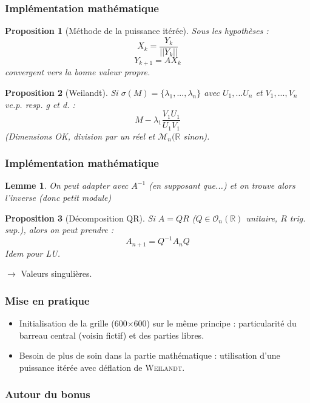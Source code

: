 \documentclass[11pt]{beamer}
\newtheorem{proposition}{Proposition}[section]
\newtheorem{lemme}{Lemme}[section]
\begin{document}
	\begin{frame}
		\frametitle{Implémentation mathématique}
		\begin{proposition}[Méthode de la puissance itérée]
			Sous les hypothèses :
			\[X_k=\frac{Y_k}{||Y_k||}\]
			\[Y_{k+1}=AX_k\]
			convergent vers la bonne valeur propre.
		\end{proposition}
	
		\begin{proposition}[Weilandt]
			Si $\sigma(M)=\{\lambda_1,...,\lambda_n\}$ avec $U_1,...U_n$ et $V_1,...,V_n$ ve.p. resp. g et d. :
			\[M-\lambda_1\frac{V_1U_1}{U_1V_1}\]
			(Dimensions OK, division par un réel et $\mathcal{M}_n(\mathbb{R}$ sinon).
		\end{proposition}
	\end{frame}

	\begin{frame}
		\frametitle{Implémentation mathématique}
		\begin{lemme}
			On peut adapter avec $A^{-1}$ (en supposant que...) et on trouve alors l'inverse (donc petit module)
		\end{lemme}
	
		\begin{proposition}[Décomposition QR]
			Si $A=QR$ ($Q\in\mathcal{O}_n(\mathbb{R})$ unitaire, $R$ trig. sup.), alors on peut prendre :
			\[A_{n+1}=Q^{-1}A_nQ\]
			Idem pour LU.
		\end{proposition}
		$\to$ Valeurs singulières.
	\end{frame}

		\begin{frame}
		\frametitle{Mise en pratique}
		\begin{itemize}
			\item Initialisation de la grille (600$\times$600) sur le même principe : particularité du barreau central (voisin fictif) et des parties libres.
			\item Besoin de plus de soin dans la partie mathématique : utilisation d'une puissance itérée avec déflation de \textsc{Weilandt}. 
		\end{itemize}
	\end{frame}

	\begin{frame}
		\frametitle{Autour du bonus}
	\end{frame}
\end{document}
